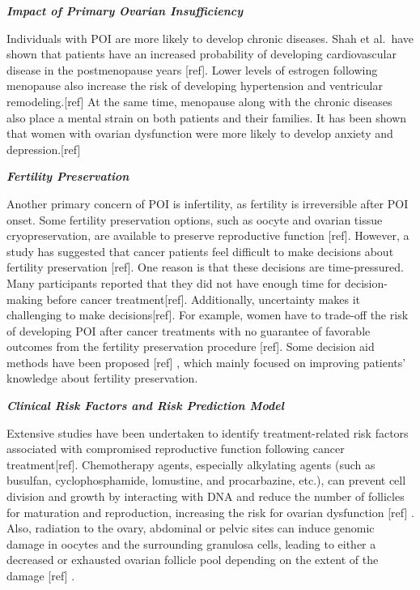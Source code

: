 \documentclass[
]{book}
\begin{document}
\textbf{\emph{Impact of Primary Ovarian Insufficiency}}

Individuals with POI are more likely to develop chronic diseases. Shah et al.~have shown that patients have an increased probability of developing cardiovascular disease in the postmenopause years {[}ref{]}. Lower levels of estrogen following menopause also increase the risk of developing hypertension and ventricular remodeling.{[}ref{]} At the same time, menopause along with the chronic diseases also place a mental strain on both patients and their families. It has been shown that women with ovarian dysfunction were more likely to develop anxiety and depression.{[}ref{]}

\textbf{\emph{Fertility Preservation}}

Another primary concern of POI is infertility, as fertility is irreversible after POI onset. Some fertility preservation options, such as oocyte and ovarian tissue cryopreservation, are available to preserve reproductive function {[}ref{]}. However, a study has suggested that cancer patients feel difficult to make decisions about fertility preservation {[}ref{]}. One reason is that these decisions are time-pressured. Many participants reported that they did not have enough time for decision-making before cancer treatment{[}ref{]}. Additionally, uncertainty makes it challenging to make decisions{[}ref{]}. For example, women have to trade-off the risk of developing POI after cancer treatments with no guarantee of favorable outcomes from the fertility preservation procedure {[}ref{]}. Some decision aid methods have been proposed {[}ref{]} , which mainly focused on improving patients' knowledge about fertility preservation.

\textbf{\emph{Clinical Risk Factors and Risk Prediction Model}}

Extensive studies have been undertaken to identify treatment-related risk factors associated with compromised reproductive function following cancer treatment{[}ref{]}. Chemotherapy agents, especially alkylating agents (such as busulfan, cyclophosphamide, lomustine, and procarbazine, etc.), can prevent cell division and growth by interacting with DNA and reduce the number of follicles for maturation and reproduction, increasing the risk for ovarian dysfunction {[}ref{]} . Also, radiation to the ovary, abdominal or pelvic sites can induce genomic damage in oocytes and the surrounding granulosa cells, leading to either a decreased or exhausted ovarian follicle pool depending on the extent of the damage {[}ref{]} .
\end{document}
